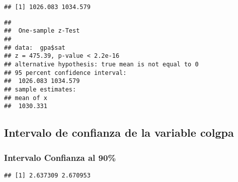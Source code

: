 \documentclass[
]{article}
\newenvironment{Shaded}{\begin{snugshade}}{\end{snugshade}}
\newcommand{\AttributeTok}[1]{\textcolor[rgb]{0.80,0.80,0.80}{#1}}
\newcommand{\CommentTok}[1]{\textcolor[rgb]{0.50,0.62,0.50}{#1}}
\newcommand{\FloatTok}[1]{\textcolor[rgb]{0.75,0.75,0.82}{#1}}
\newcommand{\FunctionTok}[1]{\textcolor[rgb]{0.94,0.94,0.56}{#1}}
\newcommand{\NormalTok}[1]{\textcolor[rgb]{0.80,0.80,0.80}{#1}}
\newcommand{\OtherTok}[1]{\textcolor[rgb]{0.94,0.94,0.56}{#1}}
\newcommand{\SpecialCharTok}[1]{\textcolor[rgb]{0.86,0.64,0.64}{#1}}
\begin{document}
\begin{verbatim}
## [1] 1026.083 1034.579
\end{verbatim}

\begin{Shaded}
\end{Shaded}

\begin{verbatim}
## 
##  One-sample z-Test
## 
## data:  gpa$sat
## z = 475.39, p-value < 2.2e-16
## alternative hypothesis: true mean is not equal to 0
## 95 percent confidence interval:
##  1026.083 1034.579
## sample estimates:
## mean of x 
##  1030.331
\end{verbatim}

\hypertarget{intervalo-de-confianza-de-la-variable-colgpa}{%
\subsection{Intervalo de confianza de la variable
colgpa}\label{intervalo-de-confianza-de-la-variable-colgpa}}

\hypertarget{intervalo-confianza-al-90-1}{%
\subsubsection{Intervalo Confianza al
90\%}\label{intervalo-confianza-al-90-1}}

\begin{Shaded}
\end{Shaded}

\begin{verbatim}
## [1] 2.637309 2.670953
\end{verbatim}

\begin{Shaded}
\end{Shaded}
\end{document}
